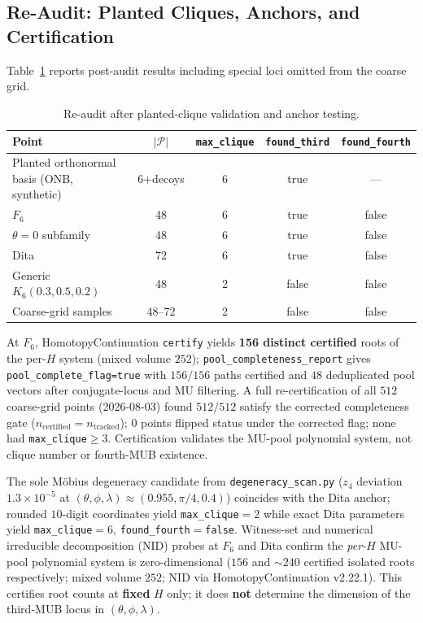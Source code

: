 \documentclass[onecolumn]{IEEEtran}
\begin{document}
\subsection{Re-Audit: Planted Cliques, Anchors, and Certification}
\label{sec:reaudit}
Table~\ref{tab:reaudit} reports post-audit results including special loci omitted from the coarse grid.

\begin{table}[t]
\caption{Re-audit after planted-clique validation and anchor testing.}
\label{tab:reaudit}
\centering
\small
\begin{tabular}{@{}lcccc@{}}
\toprule
Point & $|\mathcal{P}|$ & \texttt{max\_clique} & \texttt{found\_third} & \texttt{found\_fourth} \\
\midrule
Planted orthonormal basis (ONB, synthetic) & 6+decoys & 6 & true & --- \\
$F_6$ & 48 & 6 & true & false \\
$\theta=0$ subfamily & 48 & 6 & true & false \\
Dita & 72 & 6 & true & false \\
Generic $K_6(0.3,0.5,0.2)$ & 48 & 2 & false & false \\
Coarse-grid samples & 48--72 & 2 & false & false \\
\bottomrule
\end{tabular}
\end{table}

At $F_6$, HomotopyContinuation \texttt{certify} yields \textbf{156 distinct certified} roots of the per-$H$ system (mixed volume $252$); \texttt{pool\_completeness\_report} gives \texttt{pool\_complete\_flag=true} with $156/156$ paths certified and $48$ deduplicated pool vectors after conjugate-locus and MU filtering.
A full re-certification of all $512$ coarse-grid points (2026-08-03) found \textbf{$512/512$} satisfy the corrected completeness gate ($n_{\mathrm{certified}}=n_{\mathrm{tracked}}$); $0$ points flipped status under the corrected flag; none had \texttt{max\_clique}$\ge3$.
Certification validates the MU-pool polynomial system, not clique number or fourth-MUB existence.

The sole M\"obius degeneracy candidate from \texttt{degeneracy\_scan.py} ($z_4$ deviation $1.3\times10^{-5}$ at $(\theta,\phi,\lambda)\approx(0.955,\pi/4,0.4)$) coincides with the Dita anchor; rounded $10$-digit coordinates yield \texttt{max\_clique}$=2$ while exact Dita parameters yield \texttt{max\_clique}$=6$, \texttt{found\_fourth}$=$\texttt{false}.
Witness-set and numerical irreducible decomposition (NID) probes at $F_6$ and Dita confirm the \emph{per-$H$} MU-pool polynomial system is zero-dimensional ($156$ and $\sim240$ certified isolated roots respectively; mixed volume $252$; NID via HomotopyContinuation v2.22.1).
This certifies root counts at \textbf{fixed} $H$ only; it does \textbf{not} determine the dimension of the third-MUB locus in $(\theta,\phi,\lambda)$.
\end{document}
